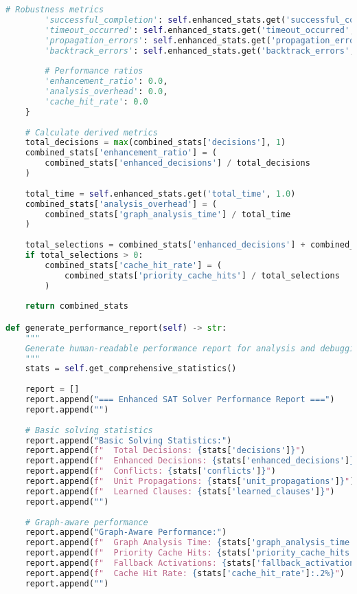 \begin{lstlisting}[language=Python, caption=Integration Challenge Resolution Implementation]
        # Robustness metrics
        'successful_completion': self.enhanced_stats.get('successful_completion', False),
        'timeout_occurred': self.enhanced_stats.get('timeout_occurred', False),
        'propagation_errors': self.enhanced_stats.get('propagation_errors', 0),
        'backtrack_errors': self.enhanced_stats.get('backtrack_errors', 0),
        
        # Performance ratios
        'enhancement_ratio': 0.0,
        'analysis_overhead': 0.0,
        'cache_hit_rate': 0.0
    }
    
    # Calculate derived metrics
    total_decisions = max(combined_stats['decisions'], 1)
    combined_stats['enhancement_ratio'] = (
        combined_stats['enhanced_decisions'] / total_decisions
    )
    
    total_time = self.enhanced_stats.get('total_time', 1.0)
    combined_stats['analysis_overhead'] = (
        combined_stats['graph_analysis_time'] / total_time
    )
    
    total_selections = combined_stats['enhanced_decisions'] + combined_stats['fallback_activations']
    if total_selections > 0:
        combined_stats['cache_hit_rate'] = (
            combined_stats['priority_cache_hits'] / total_selections
        )
    
    return combined_stats

def generate_performance_report(self) -> str:
    """
    Generate human-readable performance report for analysis and debugging.
    """
    stats = self.get_comprehensive_statistics()
    
    report = []
    report.append("=== Enhanced SAT Solver Performance Report ===")
    report.append("")
    
    # Basic solving statistics
    report.append("Basic Solving Statistics:")
    report.append(f"  Total Decisions: {stats['decisions']}")
    report.append(f"  Enhanced Decisions: {stats['enhanced_decisions']}")
    report.append(f"  Conflicts: {stats['conflicts']}")
    report.append(f"  Unit Propagations: {stats['unit_propagations']}")
    report.append(f"  Learned Clauses: {stats['learned_clauses']}")
    report.append("")
    
    # Graph-aware performance
    report.append("Graph-Aware Performance:")
    report.append(f"  Graph Analysis Time: {stats['graph_analysis_time']:.3f}s")
    report.append(f"  Priority Cache Hits: {stats['priority_cache_hits']}")
    report.append(f"  Fallback Activations: {stats['fallback_activations']}")
    report.append(f"  Cache Hit Rate: {stats['cache_hit_rate']:.2%}")
    report.append("")
    

\end{lstlisting}
